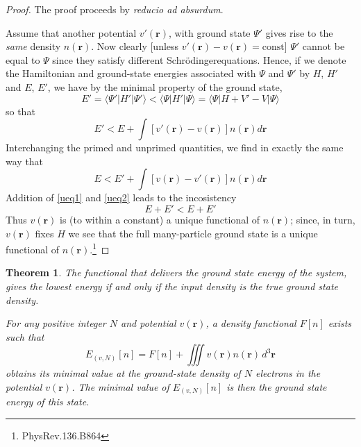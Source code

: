 \documentclass{article}
\newtheorem{theorem}{Theorem}[section]
\newtheorem{proof}{Proof}[section]
\numberwithin{equation}{section}
\newcommand{\bracketl}[3]{\langle #1 | #2 | #3 \rangle}
\newcommand{\sch}{Schr\"odinger}
\begin{document}
  \begin{proof}
  The proof proceeds by \emph{reducio ad absurdum}. 
  
  Assume that another potential $v'(\textbf{r})$, with ground state $\Psi'$ gives rise to the \emph{same} density $n(\textbf{r})$. Now clearly [unless $v'(\textbf{r})-v(\textbf{r})=\mathrm{const}$] $\Psi'$ cannot be equal to $\Psi$ since they satisfy different \sch equations. Hence, if we denote the Hamiltonian and ground-state energies associated with $\Psi$ and $\Psi'$ by $H$, $H'$ and $E$, $E'$, we have by the minimal property of the ground state,
  \begin{equation}
  E'=\bracketl{\Psi'}{H'}{\Psi'}<\bracketl{\Psi}{H'}{\Psi}=\bracketl{\Psi}{H+V'-V}{\Psi}
  \end{equation}
  so that
  \begin{equation}
  E'<E+\int [v'(\textbf{r})-v(\textbf{r})]n(\textbf{r})d\textbf{r}
  \label{ueq1}
  \end{equation}
  Interchanging the primed and unprimed quantities, we find in exactly the same way that
  \begin{equation}
  E<E'+\int [v(\textbf{r})-v'(\textbf{r})]n(\textbf{r})d\textbf{r}
  \label{ueq2}
  \end{equation}
  Addition of \ref{ueq1} and \ref{ueq2} leads to the incosistency
  \begin{equation}
  E+E'<E+E'
  \end{equation}
  Thus $v(\textbf{r})$ is (to within a constant) a unique functional of $n(\textbf{r})$; since, in turn, $v(\textbf{r})$ fixes $H$ we see that the full many-particle ground state is a unique functional of $n(\textbf{r})$.\footnote{PhysRev.136.B864}
  \end{proof}
  
  \begin{theorem}
  The functional that delivers the ground state energy of the system, gives the lowest energy if and only if the input density is the true ground state density.
  
  For any positive integer $N$ and potential $v(\textbf{r})$, a density functional $F[n]$ exists such that
  \begin{equation}
  E_{(v,N)}[n]=F[n]+\iiint v(\textbf{r})n(\textbf{r})\,d^3\textbf{r}
  \end{equation}
  obtains its minimal value at the ground-state density of $N$ electrons in the potential $v(\textbf{r})$. The minimal value of $E_{(v,N)}[n]$ is then the ground state energy of this state.
  
  \end{theorem}
  
\end{document}
